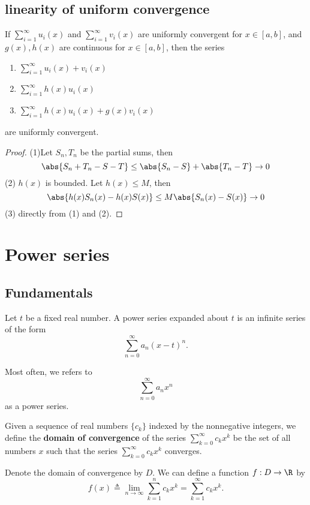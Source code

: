 \begin{refsection}
\subsection{linearity of uniform convergence}
\begin{theorem}
	If $\sum_{i=1}^\infty u_i(x)$  and $\sum_{i=1}^\infty v_i(x)$ are uniformly convergent for $x\in [a,b]$, and $g(x),h(x)$ are continuous for $x\in [a,b]$, then the series
	\begin{enumerate}
		\item $\sum_{i=1}^\infty u_i(x) + v_i(x)$
		\item $\sum_{i=1}^\infty h(x) u_i(x)$
		\item $\sum_{i=1}^\infty h(x)u_i(x)+g(x)v_i(x)$
	\end{enumerate}
	are uniformly convergent. 
\end{theorem}
\begin{proof}
	(1)Let $S_n,T_n$ be the partial sums, then
	$$\abs{S_n+T_n - S -T} \leq \abs{S_n-S} + \abs{T_n-T} \to 0$$
	(2) $h(x)$ is bounded. Let $h(x) \leq M$, then
	$$\abs{h(x)S_n(x) - h(x)S(x)} \leq M\abs{S_n(x)-S(x)} \to 0$$
	(3) directly from (1) and (2).	
\end{proof}


\section{Power series}
\subsection{Fundamentals}
\begin{definition}
	Let $t$ be a fixed real number. A power series expanded about $t$ is an infinite series of the form
	$$\sum_{n=0}^\infty a_n(x-t)^n.$$
	
	Most often, we refers to
	$$\sum_{n=0}^\infty a_nx^n$$
	as a power series.
\end{definition}

\begin{definition}\cite[255]{fitzpatrick2006advanced}
	Given a sequence of real numbers $\{c_k\}$ indexed by the nonnegative integers, we define the \textbf{domain of convergence} of the series $\sum_{k=0}^\infty c_kx^k$ be the set of all numbers $x$ such that the series
	$\sum_{k=0}^\infty c_kx^k$
	converges. 
	
	Denote the domain of convergence by $D$. We can define a function $f:D\to \R$ by
	$$f(x) \triangleq \lim_{n\to \infty} \sum_{k=1}^n c_k x^k = \sum_{k=1}^\infty c_k x^k.$$	
\end{definition}




\end{refsection}
